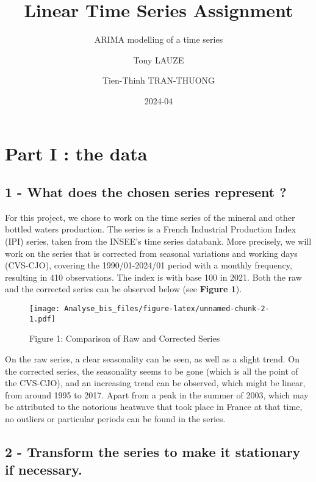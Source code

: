 \documentclass[
]{article}
\title{Linear Time Series Assignment}
\subtitle{ARIMA modelling of a time series}
\author{Tony LAUZE \and Tien-Thinh TRAN-THUONG}
\date{2024-04}
\begin{document}
\maketitle

\hypertarget{part-i-the-data}{%
\section{Part I : the data}\label{part-i-the-data}}

\hypertarget{what-does-the-chosen-series-represent}{%
\subsection{1 - What does the chosen series represent
?}\label{what-does-the-chosen-series-represent}}

For this project, we chose to work on the time series of the mineral and
other bottled waters production. The series is a French Industrial
Production Index (IPI) series, taken from the INSEE's time series
databank. More precisely, we will work on the series that is corrected
from seasonal variations and working days (CVS-CJO), covering the
1990/01-2024/01 period with a monthly frequency, resulting in 410
observations. The index is with base 100 in 2021. Both the raw and the
corrected series can be observed below (see \textbf{Figure 1}).

\begin{figure}
\centering
\texttt{[image: Analyse\_bis\_files/figure-latex/unnamed-chunk-2-1.pdf]}
\caption{Figure 1: Comparison of Raw and Corrected Series}
\end{figure}

On the raw series, a clear seasonality can be seen, as well as a slight
trend. On the corrected series, the seasonality seems to be gone (which
is all the point of the CVS-CJO), and an increasing trend can be
observed, which might be linear, from around 1995 to 2017. Apart from a
peak in the summer of 2003, which may be attributed to the notorious
heatwave that took place in France at that time, no outliers or
particular periods can be found in the series.

\hypertarget{transform-the-series-to-make-it-stationary-if-necessary.}{%
\subsection{2 - Transform the series to make it stationary if
necessary.}\label{transform-the-series-to-make-it-stationary-if-necessary.}}
\end{document}
